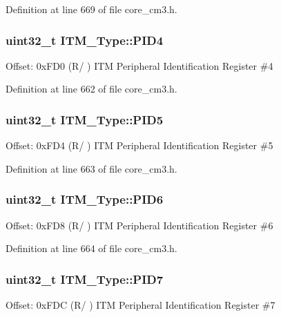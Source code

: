 Definition at line 669 of file core\+\_\+cm3.\+h.

\subsubsection[{\texorpdfstring{P\+I\+D4}{PID4}}]{ uint32\+\_\+t I\+T\+M\+\_\+\+Type\+::\+P\+I\+D4}\hypertarget{structITM__Type_accfc7de00b0eaba0301e8f4553f70512}{}\label{structITM__Type_accfc7de00b0eaba0301e8f4553f70512}
Offset\+: 0x\+F\+D0 (R/ ) I\+TM Peripheral Identification Register \#4 

Definition at line 662 of file core\+\_\+cm3.\+h.

\subsubsection[{\texorpdfstring{P\+I\+D5}{PID5}}]{ uint32\+\_\+t I\+T\+M\+\_\+\+Type\+::\+P\+I\+D5}\hypertarget{structITM__Type_a9353055ceb7024e07d59248e54502cb9}{}\label{structITM__Type_a9353055ceb7024e07d59248e54502cb9}
Offset\+: 0x\+F\+D4 (R/ ) I\+TM Peripheral Identification Register \#5 

Definition at line 663 of file core\+\_\+cm3.\+h.

\subsubsection[{\texorpdfstring{P\+I\+D6}{PID6}}]{ uint32\+\_\+t I\+T\+M\+\_\+\+Type\+::\+P\+I\+D6}\hypertarget{structITM__Type_a755c0ec919e7dbb5f7ff05c8b56a3383}{}\label{structITM__Type_a755c0ec919e7dbb5f7ff05c8b56a3383}
Offset\+: 0x\+F\+D8 (R/ ) I\+TM Peripheral Identification Register \#6 

Definition at line 664 of file core\+\_\+cm3.\+h.

\subsubsection[{\texorpdfstring{P\+I\+D7}{PID7}}]{ uint32\+\_\+t I\+T\+M\+\_\+\+Type\+::\+P\+I\+D7}\hypertarget{structITM__Type_aa31ca6bb4b749201321b23d0dbbe0704}{}\label{structITM__Type_aa31ca6bb4b749201321b23d0dbbe0704}
Offset\+: 0x\+F\+DC (R/ ) I\+TM Peripheral Identification Register \#7 

